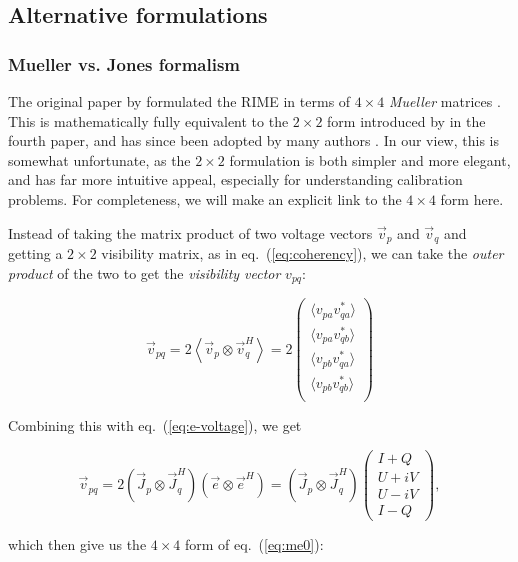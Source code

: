 \documentclass[]{aa}
\newcommand{\herm}{H}
\newcommand{\jones}[2]{\vec {#1}_{#2}}
\newcommand{\jonesT}[2]{\vec {#1}^{\herm}_{#2}}
\begin{document}
\subsection{\label{sec:formulations}Alternative formulations}

\subsubsection{Mueller vs. Jones formalism}

The original paper by \citet{ME1} formulated the RIME in terms of $4\times4$ {\em Mueller} matrices \citep{Muller}. This is mathematically fully equivalent to the $2\times2$ form introduced by \citet{ME4} in the fourth paper, and has since been adopted by many authors \citep{JEN:note185,tms,SB:imageplane,Rau:DDEs}. In our view, this is somewhat unfortunate, as the $2\times2$ formulation is both simpler and more elegant, and has far more intuitive appeal, especially for understanding calibration problems. For completeness, we will make an explicit link to the $4\times4$ form here.

Instead of taking the matrix product of two voltage vectors $\vec v_p$ and $\vec v_q$ and getting a $2\times2$ visibility matrix, as in eq.~(\ref{eq:coherency}), we can take the {\em outer product} of the two to get the {\em visibility vector} $v_{pq}$:

\[
\vec v_{pq} = 2 \left< \vec v_p \otimes \vec v^\herm_q \right > = 2 \left ( 
\begin{array}{c}
    \langle v_{pa}v^*_{qa}\rangle \\ \langle v_{pa}v^*_{qb}\rangle \\
    \langle v_{pb}v^*_{qa}\rangle \\ \langle v_{pb}v^*_{qb}\rangle \\
\end{array} 
\right ) 
\]

Combining this with eq.~(\ref{eq:e-voltage}), we get

\[
    \vec v_{pq} = 2 ( \jones{J}{p} \otimes \jonesT{J}{q} ) (\vec e \otimes \vec e^\herm )
 = ( \jones{J}{p} \otimes \jonesT{J}{q} ) 
\left ( \begin{array}{c}
I+Q \\ U+iV \\ U-iV \\ I-Q
\end{array} \right ), 
\]

which then give us the $4\times4$ form of eq.~(\ref{eq:me0}):
\end{document}
